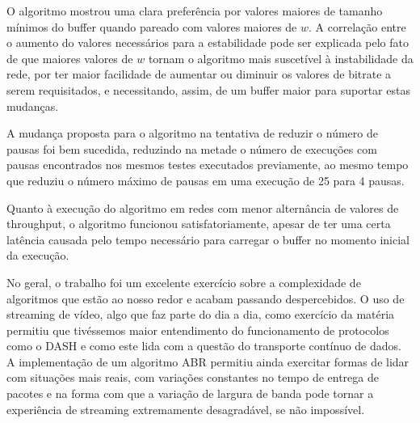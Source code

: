 \documentclass[10pt,twocolumn,letterpaper]{article}
\begin{document}
	O algoritmo mostrou uma clara preferência por valores maiores de tamanho mínimos do buffer quando pareado com valores maiores de $w$. A correlação entre o aumento do valores necessários para a estabilidade pode ser explicada pelo fato de que maiores valores de $w$ tornam o algoritmo mais suscetível à instabilidade da rede, por ter maior facilidade de aumentar ou diminuir os valores de bitrate a serem requisitados, e necessitando, assim, de um buffer maior para suportar estas mudanças. 
	
	A mudança proposta para o algoritmo na tentativa de reduzir o número de pausas foi bem sucedida, reduzindo na metade o número de execuções com pausas encontrados nos mesmos testes executados previamente, ao mesmo tempo que reduziu o número máximo de pausas em uma execução de 25 para 4 pausas. 
	
	Quanto à execução do algoritmo em redes com menor alternância de valores de throughput, o algoritmo funcionou satisfatoriamente, apesar de ter uma certa latência causada pelo tempo necessário para carregar o buffer no momento inicial da execução. 
	
	No geral, o trabalho foi um excelente exercício sobre a complexidade de algoritmos que estão ao nosso redor e acabam passando despercebidos. O uso de streaming de vídeo, algo que faz parte do dia a dia, como exercício da matéria permitiu que tivéssemos maior entendimento do funcionamento de protocolos como o DASH e como este lida com a questão do transporte contínuo de dados. A implementação de um algoritmo ABR permitiu ainda exercitar formas de lidar com situações mais reais, com variações constantes no tempo de entrega de pacotes e na forma com que a variação de largura de banda pode tornar a experiência de streaming extremamente desagradável, se não impossível.
	
	{\small
		
		
	}
	
\end{document}
